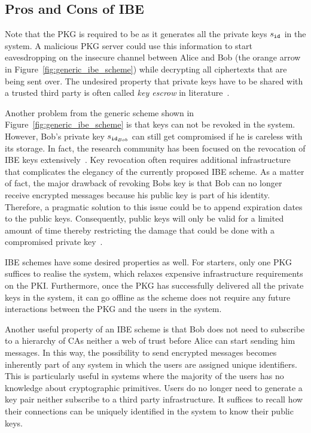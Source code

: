 \subsection{Pros and Cons of IBE}
\label{sec:pros_and_cons_of_ibe}
Note that the PKG is required to be as it generates all the private keys $s_{\mathtt{id}_{}}$ in the system. A malicious PKG server could use this information to start eavesdropping on the insecure channel between Alice and Bob (the orange arrow in Figure~\ref{fig:generic_ibe_scheme}) while decrypting all ciphertexts that are being sent over. The undesired property that private keys have to be shared with a trusted third party is often called \textit{key escrow} in literature~\cite{art:AbelsonHARBMBJBMDWGJNGRLSISB97}.

Another problem from the generic scheme shown in Figure~\ref{fig:generic_ibe_scheme} is that keys can not be revoked in the system. However, Bob's private key $s_{\mathtt{id}_{Bob}}$ can still get compromised if he is careless with its storage. In fact, the research community has been focused on the revocation of IBE keys extensively~\cite{art:BoldyrevaGK12,art:BonehDTW01,art:HanaokaHSI05,art:LibertQ03}. Key revocation often requires additional infrastructure that complicates the elegancy of the currently proposed IBE scheme. As a matter of fact, the major drawback of revoking Bobs key is that Bob can no longer receive encrypted messages because his public key is part of his identity. Therefore, a pragmatic solution to this issue could be to append expiration dates to the public keys. Consequently, public keys will only be valid for a limited amount of time thereby restricting the damage that could be done with a compromised private key~\cite{art:BonehF01}.

IBE schemes have some desired properties as well. For starters, only one PKG suffices to realise the system, which relaxes expensive infrastructure requirements on the PKI. Furthermore, once the PKG has successfully delivered all the private keys in the system, it can go offline as the scheme does not require any future interactions between the PKG and the users in the system.

Another useful property of an IBE scheme is that Bob does not need to subscribe to a hierarchy of CAs neither a web of trust before Alice can start sending him messages. In this way, the possibility to send encrypted messages becomes inherently part of any system in which the users are assigned unique identifiers. This is particularly useful in systems where the majority of the users has no knowledge about cryptographic primitives.  Users do no longer need to generate a key pair neither subscribe to a third party infrastructure. It suffices to recall how their connections can be uniquely identified in the system to know their public keys.

